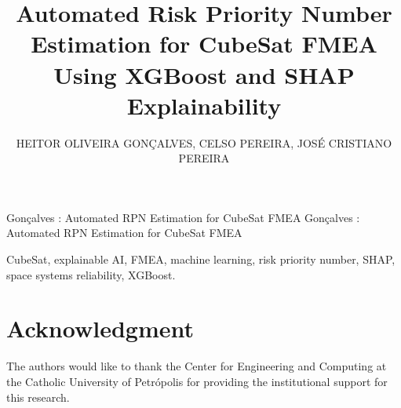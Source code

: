 \documentclass{ieeeaccess}
\begin{document}

\title{Automated Risk Priority Number Estimation for CubeSat FMEA Using XGBoost and SHAP Explainability}

\author{\uppercase{Heitor Oliveira Gon\c{c}alves},
\uppercase{Celso Pereira},
\uppercase{Jos\'{e} Cristiano Pereira}}

\address[1]{Center for Engineering and Computing, Catholic University of Petr\'{o}polis, Petr\'{o}polis, RJ, Brazil
(e-mail: heitorhog@gmail.com, cpereira.eng@gmail.com, josecristiano.pereira@ucp.br)}


\markboth
{Gon\c{c}alves \headeretal: Automated RPN Estimation for CubeSat FMEA}
{Gon\c{c}alves \headeretal: Automated RPN Estimation for CubeSat FMEA}


\begin{abstract}

\end{abstract}

\begin{keywords}
CubeSat, explainable AI, FMEA, machine learning, risk priority number, SHAP, space systems reliability, XGBoost.
\end{keywords}

\titlepgskip=-21pt

\maketitle







\section*{Acknowledgment}
The authors would like to thank the Center for Engineering and Computing at the Catholic University of Petr\'{o}polis for providing the institutional support for this research.
\end{document}
